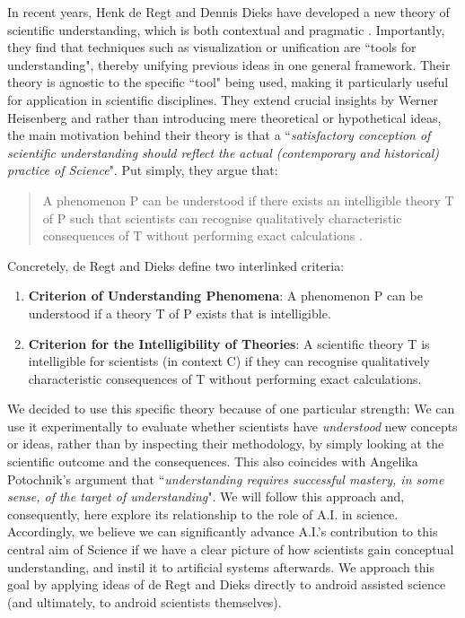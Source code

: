 In recent years, Henk de Regt and Dennis Dieks have developed a new theory of scientific understanding, which is both contextual and pragmatic \cite{de2005contextual,de2017understanding,de2020understanding}. Importantly, they find that techniques such as visualization or unification are ``tools for understanding", thereby unifying previous ideas in one general framework. Their theory is agnostic to the specific ``tool" being used, making it particularly useful for application in scientific disciplines. They extend crucial insights by Werner Heisenberg \cite{heisenberg1927} and rather than introducing mere theoretical or hypothetical ideas, the main motivation behind their theory is that a ``\textit{satisfactory conception of scientific understanding should reflect the actual (contemporary and historical) practice of Science}". Put simply, they argue that:
\begingroup
\addtolength\leftmargini{-0.1in}
\begin{quote}
A phenomenon P can be understood if there exists an intelligible theory T of P such that scientists can recognise qualitatively characteristic consequences of T without performing exact calculations \cite{de2005contextual,de2017understanding}.
\end{quote}
\endgroup

Concretely, de Regt and Dieks define two interlinked criteria:
\begin{enumerate}
\item \textbf{Criterion of Understanding Phenomena}: A phenomenon P can be understood if a theory T of P exists that is intelligible.
\item \textbf{Criterion for the Intelligibility of Theories}: A scientific theory T is intelligible for scientists (in context C) if they can recognise qualitatively characteristic consequences of T without performing exact calculations.
\end{enumerate}

We decided to use this specific theory because of one particular strength: We can use it experimentally to evaluate whether scientists have \textit{understood} new concepts or ideas, rather than by inspecting their methodology, by simply looking at the scientific outcome and the consequences. This also coincides with Angelika Potochnik's argument that ``\textit{understanding requires successful mastery, in some sense, of the target of understanding}"\cite{potochnik2017idealization}. We will follow this approach and, consequently, here explore its relationship to the role of A.I. in science. Accordingly, we believe we can significantly advance A.I.'s contribution to this central aim of Science if we have a clear picture of how scientists gain conceptual understanding, and instil it to artificial systems afterwards. We approach this goal by applying ideas of de Regt and Dieks directly to android assisted science (and ultimately, to android scientists themselves).

